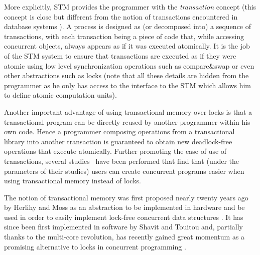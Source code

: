\documentclass[runningheads,a4paper]{article}
\begin{document}
More explicitly,  STM  
 provides the 
programmer  with the {\it transaction} concept (this concept 
is close but different from the notion of transactions encountered in 
database systems \cite{FFGH08,HCUAGSV07,HL08}).
 A process is designed as 
(or decomposed into)  a sequence of transactions, with each transaction 
being a piece  of code that, while  accessing  concurrent  objects, 
always  appears as if it was  executed atomically.
It  is the job of the 
STM system to ensure that transactions are executed as if they were atomic using low level synchronization
operations such as compare\&swap or even other abstractions such as locks
(note that all these details are hidden from the programmer as he only has access to the interface
to the STM which allows him to define atomic computation units).

Another important advantage of using transactional memory over locks is that a transactional program
can be directly reused by another programmer within his own code.
Hence a programmer composing operations from a transactional library into another 
transaction is guaranteed to obtain new deadlock-free operations that execute atomically.
Further promoting the ease of use of transactions, several studies~\cite{PA11,RHW10}
have been performed that find that (under the parameters of their studies) users can create concurrent programs
easier when using transactional memory instead of locks.


The notion  of   transactional  memory  was
first   proposed  nearly twenty years ago by Herlihy  and Moss 
as an abstraction to be implemented in hardware and be used in order to easily 
implement lock-free concurrent  data structures  \cite{HM93}.  It  has  since  been 
first implemented in software  by Shavit  and  Touitou   \cite{ST97} and, partially thanks
to the multi-core revolution,  has
recently gained great  momentum as  a promising alternative  to locks in
concurrent programming  \cite{FFGH08,HCUAGSV07,LK08,R08}.
\end{document}

